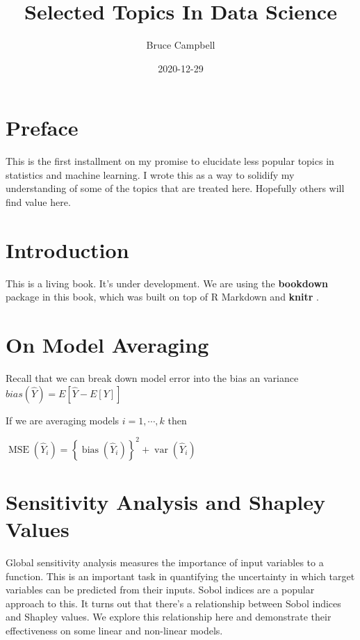 \documentclass[
  11pt,
]{book}
\title{Selected Topics In Data Science}
\author{Bruce Campbell}
\date{2020-12-29}
\begin{document}
\maketitle

\hypertarget{preface}{%
\chapter{Preface}\label{preface}}

This is the first installment on my promise to elucidate less popular topics in statistics and machine learning. I wrote this as a way to solidify my understanding of some of the topics that are treated here. Hopefully others will find value here.

\hypertarget{intro}{%
\chapter{Introduction}\label{intro}}

This is a living book. It's under development. We are using the \textbf{bookdown} package \citep{R-bookdown} in this book, which was built on top of R Markdown and \textbf{knitr} \citep{xie2015}.

\hypertarget{on-model-averaging}{%
\chapter{On Model Averaging}\label{on-model-averaging}}

Recall that we can break down model error into the bias an variance \(bias(\hat{Y})= E[\hat{Y}-E[Y]]\)

If we are averaging models \(i=1, \cdots ,k\) then

\(\operatorname{MSE}\left(\hat{Y}_{i}\right)=\left\{\operatorname{bias}\left(\hat{Y}_{i}\right)\right\}^{2}+\operatorname{var}\left(\hat{Y}_{i}\right)\)

\hypertarget{sensitivity-analysis-and-shapley-values}{%
\chapter{Sensitivity Analysis and Shapley Values}\label{sensitivity-analysis-and-shapley-values}}

Global sensitivity analysis measures the importance of input variables to a function. This is an important task in quantifying the uncertainty in which target variables can be predicted from their inputs. Sobol indices \citep{sobolindices} are a popular approach to this. It turns out that there's a relationship between Sobol indices and Shapley values. We explore this relationship here and demonstrate their effectiveness on some linear and non-linear models.
\end{document}
